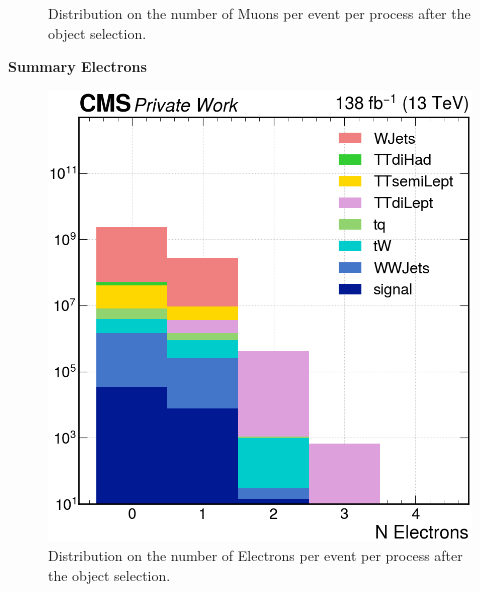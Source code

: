 \begin{minipage}{\linewidth}
\begin{minipage}{0.53\linewidth}
\begin{figure}[H]
            \caption{Distribution on the number of Muons per event per process after the object selection.}
            \label{fig:n_mu}
        \end{figure}
\end{minipage}
\end{minipage}




\begin{center}
    \vspace{1cm}
    \fontsize{14}{14}\selectfont
    \textbf{Summary Electrons}
\end{center}
\begin{minipage}{\linewidth}
    \begin{minipage}{0.53\linewidth}
        \begin{figure}[H]
            \centering
            \includegraphics[width=1\linewidth]{fig//chap07-selection/nElectrons.png}
            \caption{Distribution on the number of Electrons per event per process after the object selection.}
            \label{fig:n_ele}
        \end{figure}
    \end{minipage}
    \hfill
    \begin{minipage}{0.46\linewidth}
        \vspace{-1.5cm}

\end{minipage}
\end{minipage}
